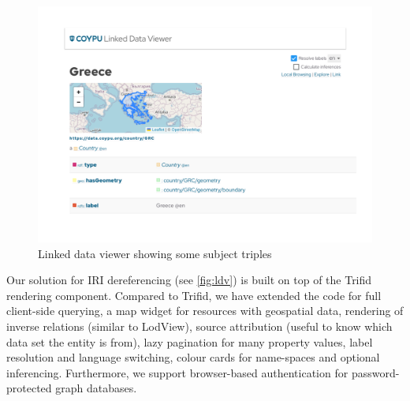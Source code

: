 \documentclass[
hf
]{ceurart}
\begin{document}
\begin{figure}
    \centering
    \includegraphics[width=\textwidth,trim={1.8cm 2cm 1.8cm 1cm},clip]{Linked Data Viewer.pdf}
    \caption{Linked data viewer showing some %
    subject triples}
    \label{fig:ldv}
\end{figure}

Our solution for IRI dereferencing (see \autoref{fig:ldv}) is built on top of the Trifid rendering component. Compared to Trifid, we have extended the code for full client-side querying, a map widget for resources with geospatial data, rendering of inverse relations (similar to LodView), source attribution (useful to know which data set the entity is from), lazy pagination for many property values, label resolution and language switching, colour cards for name-spaces and optional inferencing. Furthermore, we support browser-based authentication for password-protected graph databases. 
\end{document}
